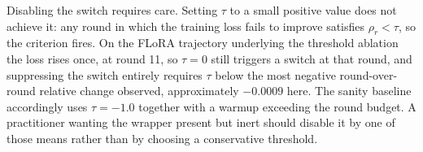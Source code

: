 \documentclass{ieeetj}
\begin{document}
Disabling the switch requires care. Setting $\tau$ to a small positive value does not achieve it: any round in which the training loss fails to improve satisfies $\rho_r < \tau$, so the criterion fires. On the FLoRA trajectory underlying the threshold ablation the loss rises once, at round 11, so $\tau{=}0$ still triggers a switch at that round, and suppressing the switch entirely requires $\tau$ below the most negative round-over-round relative change observed, approximately $-0.0009$ here. The sanity baseline accordingly uses $\tau{=}-1.0$ together with a warmup exceeding the round budget. A practitioner wanting the wrapper present but inert should disable it by one of those means rather than by choosing a conservative threshold.



\end{document}
